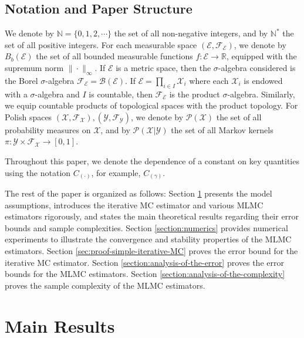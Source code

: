 \documentclass[11pt]{article}
\numberwithin{equation}{section}
\theoremstyle{definition}
\theoremstyle{remark}
\def\N{{\mathbb{N}}}
\def\R{{\mathbb R}}
\begin{document}
\subsection{Notation and Paper Structure}
\label{subsection:notations}
We denote by  $\N = \{0, 1, 2, \cdots\}$    the set of all non-negative integers, and by 
$\N^*$   the set of all positive integers.   
For each measurable space 
$(\mathcal E, \mathcal F_{\mathcal E})$, 
we denote by  $B_b(\mathcal E)$   the set of all   bounded measurable functions $f: \mathcal E\rightarrow \R$, equipped with the  supremum norm $\|\cdot\|_\infty$. 
If $\mathcal E$ is a metric space, then the $\sigma$-algebra considered is the Borel $\sigma$-algebra $\mathcal F_{\mathcal E} = \mathcal B(\mathcal E)$. If $\mathcal E = \prod_{i \in I} \mathcal X_i$ where each $\mathcal X_i$ is endowed with a $\sigma$-algebra and $I$ is countable, then $\mathcal F_{\mathcal E}$ is the product $\sigma$-algebra. Similarly, we equip countable products of topological spaces with the product topology. For Polish spaces $(\mathcal X,\mathcal F_{\mathcal X}), (\mathcal Y, \mathcal F_{\mathcal Y})$, we denote by $\mathcal P (\mathcal X)$ the set of all probability measures on $\mathcal X$, and by $\mathcal P ( \mathcal X | \mathcal Y)$ the set of all Markov kernels  $\pi: \mathcal Y\times \mathcal F_{\mathcal X}   \rightarrow [0,1]$.

Throughout this paper, 
we denote the dependence of a constant on key quantities using the notation 
$C_{(\cdot)}$,
for example,  $C_{(\gamma)}$.



The rest of the paper is organized as follows:  
Section \ref{section:problem-formulation} presents the model assumptions, introduces the iterative MC estimator and various MLMC estimators rigorously, and states the main theoretical results regarding their error bounds and sample complexities.  
Section \ref{section:numerics} provides numerical experiments to illustrate the convergence and stability properties of the MLMC estimators.  
Section \ref{sec:proof-simple-iterative-MC} proves the error bound for the iterative MC estimator.  
Section \ref{section:analysis-of-the-error} proves the error bounds for the MLMC estimators.  
Section \ref{section:analysis-of-the-complexity} proves the sample complexity of the MLMC estimators.  

  


\section{Main Results}
\label{section:problem-formulation}
\end{document}

